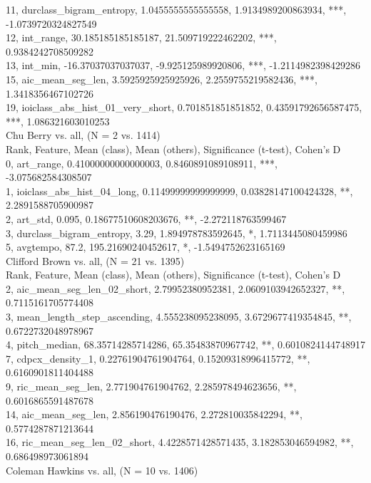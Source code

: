 11, durclass_bigram_entropy, 1.0455555555555558, 1.9134989200863934, ***, -1.0739720324827549\\
12, int_range, 30.185185185185187, 21.509719222462202, ***, 0.9384242708509282\\
13, int_min, -16.37037037037037, -9.925125989920806, ***, -1.2114982398429286\\
15, aic_mean_seg_len, 3.5925925925925926, 2.2559755219582436, ***, 1.3418356467102726\\
19, ioiclass_abs_hist_01_very_short, 0.701851851851852, 0.43591792656587475, ***, 1.086321603010253\\
Chu Berry vs. all, (N = 2 vs. 1414)\\
Rank, Feature, Mean (class), Mean (others), Significance (t-test), Cohen's D\\
0, art_range, 0.41000000000000003, 0.8460891089108911, ***, -3.075682584308507\\
1, ioiclass_abs_hist_04_long, 0.11499999999999999, 0.03828147100424328, **, 2.2891588705900987\\
2, art_std, 0.095, 0.18677510608203676, **, -2.272118763599467\\
3, durclass_bigram_entropy, 3.29, 1.894978783592645, *, 1.7113445080459986\\
5, avgtempo, 87.2, 195.21690240452617, *, -1.5494752623165169\\
Clifford Brown vs. all, (N = 21 vs. 1395)\\
Rank, Feature, Mean (class), Mean (others), Significance (t-test), Cohen's D\\
2, aic_mean_seg_len_02_short, 2.79952380952381, 2.0609103942652327, **, 0.7115161705774408\\
3, mean_length_step_ascending, 4.555238095238095, 3.6729677419354845, **, 0.6722732048978967\\
4, pitch_median, 68.35714285714286, 65.35483870967742, **, 0.6010824144748917\\
7, cdpcx_density_1, 0.22761904761904764, 0.15209318996415772, **, 0.6160901811404488\\
9, ric_mean_seg_len, 2.771904761904762, 2.285978494623656, **, 0.6016865591487678\\
14, aic_mean_seg_len, 2.856190476190476, 2.272810035842294, **, 0.5774287871213644\\
16, ric_mean_seg_len_02_short, 4.4228571428571435, 3.182853046594982, **, 0.686498973061894\\
Coleman Hawkins vs. all, (N = 10 vs. 1406)\\
